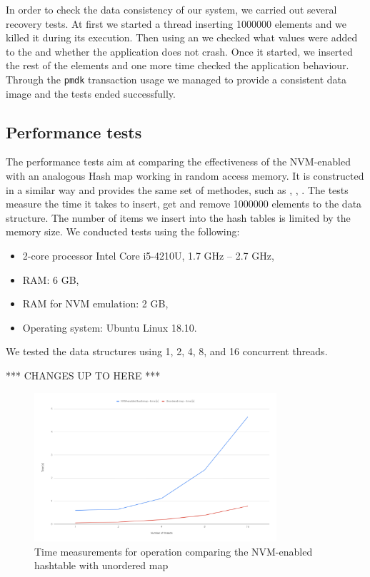     In order to check the data consistency of our system, we carried out several recovery tests. 
    At first we started a thread inserting 1000000 elements and we killed it during its execution. 
    Then using an \Iterator we checked what values were added to the \PHT and whether the application does not crash.
    Once it started, we inserted the rest of the elements and one more time checked the application behaviour. 
    Through the \texttt{pmdk} transaction usage we managed to provide a consistent data image and the tests ended successfully.
    

\subsection{Performance tests}

    The performance tests aim at comparing the effectiveness of the NVM-enabled \PHT with an analogous Hash map working in random access memory. 
    It is constructed in a similar way and provides the same set of methodes, such as \insertMethod, \getMethod, \removeMethod. 
    The tests measure the time it takes to insert, get and remove 1000000 elements to the data structure. The number of items we insert into the hash tables is limited by the memory size. We conducted tests using the following:
    \begin{itemize}
        \item 2-core processor Intel Core i5-4210U, 1.7 GHz -- 2.7 GHz,
        \item RAM: 6 GB,
        \item RAM for NVM emulation: 2 GB,
        \item Operating system: Ubuntu Linux 18.10. 
    \end{itemize}
    We tested the data structures using 1, 2, 4, 8, and 16 concurrent threads. 
    
    *** CHANGES UP TO HERE ***

    \begin{figure}[ht]
        \centering
        \includegraphics[width=0.8\textwidth]{thesis/figures/insert.png}
        \caption{Time measurements for \insertMethod operation comparing the NVM-enabled hashtable with unordered map}
        \label{insertPlot}
    \end{figure}
    
